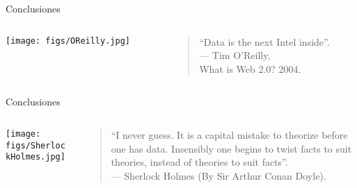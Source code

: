 
\begin{frame}{Conclusiones}
 \begin{columns}[T]
    \begin{column}{.4\textwidth}
    \texttt{[image: figs/OReilly.jpg]}
    \end{column}
    \begin{column}{.6\textwidth}
    \vspace*{2.5cm}
    \begin{quotation}
     ``Data is the next Intel inside''.\\
     — Tim O'Reilly,\\
     What is Web 2.0? 2004.
    \end{quotation}

    \end{column}
  \end{columns}

\end{frame}


\begin{frame}{Conclusiones}
 \begin{columns}[T]
    \begin{column}{.35\textwidth}
    \texttt{[image: figs/SherlockHolmes.jpg]}
    \end{column}
    \begin{column}{.65\textwidth}
    \vspace*{1.3cm}
    \begin{quotation}
     ``I never guess. It is a capital mistake to theorize before one has data. 
     Insensibly one begins to twist facts to suit theories, instead of theories 
     to suit facts''.\\
     — Sherlock Holmes (By Sir Arthur Conan Doyle).
    \end{quotation}

    \end{column}
  \end{columns}

\end{frame}


